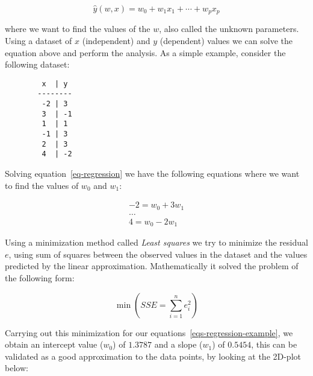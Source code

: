 \begin{equation}
  \label{eq-regression}
  \hat{y}(w,x) = w_0 + w_1 x_1 + \cdots + w_p x_p
\end{equation}

where we want to find the values of the $w$, also called the unknown
parameters. Using a dataset of $x$ (independent) and $y$ (dependent) values we
can solve the equation above and perform the analysis. As a simple example,
consider the following dataset:

\begin{figure}[H]
  \centering
  \begin{BVerbatim}
   x  | y
  --------
   -2 | 3
   3  | -1
   1  | 1
   -1 | 3
   2  | 3
   4  | -2
  \end{BVerbatim}
\end{figure}

Solving equation~\ref{eq-regression} we have the following equations where we
want to find the values of $w_0$ and $w_1$:

\begin{equation}
  \label{eqs-regression-example}
  \begin{split}
    -2 = w_0 + 3 w_1 \\
    \dots \\
    4 = w_0 - 2 w_1
  \end{split}
\end{equation}

Using a minimization method called \textit{Least squares} we try to minimize
the residual $e$, using sum of squares between the observed values in the
dataset and the values predicted by the linear approximation. Mathematically it
solved the problem of the following form:

\begin{equation}
  \min (SSE = \sum_{i=1}^{n} e_i^2)
\end{equation}

Carrying out this minimization for our equations~\ref{eqs-regression-example},
we obtain an intercept value ($w_0$) of $1.3787$ and a slope ($w_1$) of
$0.5454$, this can be validated as a good approximation to the data points, by
looking at the 2D-plot below:

\begin{figure}[H]
  \centering
\end{figure}

